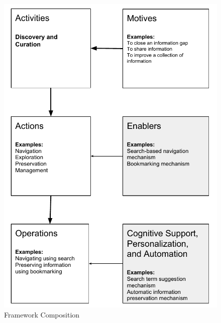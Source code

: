 \documentclass{sigchi}
\begin{document}
\begin{figure}[ht!]
	\noindent
	\centering
    \includegraphics[width=\columnwidth]{figures/framework_overview.pdf}
	\caption{Framework Composition}
	\label{fig:framework_overview} 
\end{figure}
\end{document}
